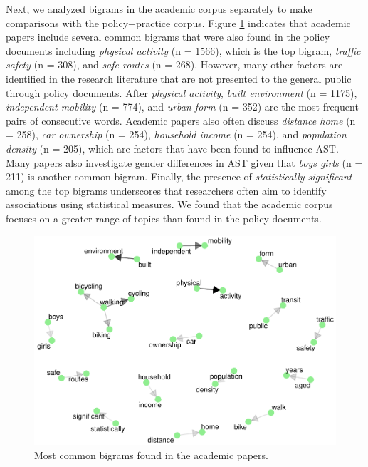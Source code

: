 \documentclass[]{elsarticle} %
\begin{document}
Next, we analyzed bigrams in the academic corpus separately to make
comparisons with the policy+practice corpus. Figure
\ref{fig:academic-visual} indicates that academic papers include several
common bigrams that were also found in the policy documents including
\emph{physical activity} (n = 1566), which is the top bigram,
\emph{traffic safety} (n = 308), and \emph{safe routes} (n = 268).
However, many other factors are identified in the research literature
that are not presented to the general public through policy documents.
After \emph{physical activity}, \emph{built environment} (n = 1175),
\emph{independent mobility} (n = 774), and \emph{urban form} (n = 352)
are the most frequent pairs of consecutive words. Academic papers also
often discuss \emph{distance home} (n = 258), \emph{car ownership} (n =
254), \emph{household income} (n = 254), and \emph{population density}
(n = 205), which are factors that have been found to influence AST. Many
papers also investigate gender differences in AST given that \emph{boys
girls} (n = 211) is another common bigram. Finally, the presence of
\emph{statistically significant} among the top bigrams underscores that
researchers often aim to identify associations using statistical
measures. We found that the academic corpus focuses on a greater range
of topics than found in the policy documents.

\begin{figure}

{\centering \includegraphics[width=1\linewidth]{AST-Framing-Ontario_files/figure-latex/academic-visual-1} 

}

\caption{\label{fig:academic-visual}Most common bigrams found in the academic papers.}\label{fig:academic-visual}
\end{figure}
\end{document}
